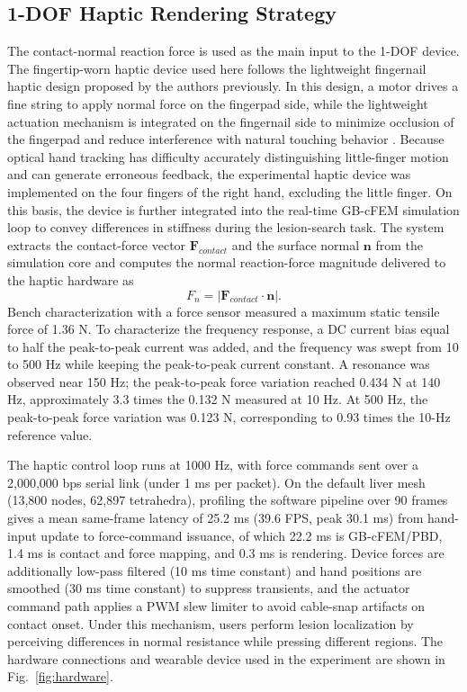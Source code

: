 \documentclass{ieeeaccess}
\begin{document}
\subsection{1-DOF Haptic Rendering Strategy}
The contact-normal reaction force is used as the main input to the 1-DOF device. The fingertip-worn haptic device used here follows the lightweight fingernail haptic design proposed by the authors previously. In this design, a motor drives a fine string to apply normal force on the fingerpad side, while the lightweight actuation mechanism is integrated on the fingernail side to minimize occlusion of the fingerpad and reduce interference with natural touching behavior \cite{xu2025lightweight}. Because optical hand tracking has difficulty accurately distinguishing little-finger motion and can generate erroneous feedback, the experimental haptic device was implemented on the four fingers of the right hand, excluding the little finger. On this basis, the device is further integrated into the real-time GB-cFEM simulation loop to convey differences in stiffness during the lesion-search task. The system extracts the contact-force vector $\mathbf{F}_{contact}$ and the surface normal $\mathbf{n}$ from the simulation core and computes the normal reaction-force magnitude delivered to the haptic hardware as
\begin{equation}
F_n = \left| \mathbf{F}_{contact} \cdot \mathbf{n} \right|.
\end{equation}
Bench characterization with a force sensor measured a maximum static tensile force of 1.36 N. To characterize the frequency response, a DC current bias equal to half the peak-to-peak current was added, and the frequency was swept from 10 to 500 Hz while keeping the peak-to-peak current constant. A resonance was observed near 150 Hz; the peak-to-peak force variation reached 0.434 N at 140 Hz, approximately 3.3 times the 0.132 N measured at 10 Hz. At 500 Hz, the peak-to-peak force variation was 0.123 N, corresponding to 0.93 times the 10-Hz reference value.

The haptic control loop runs at 1000 Hz, with force commands sent over a 2{,}000{,}000 bps serial link (under 1 ms per packet). On the default liver mesh (13{,}800 nodes, 62{,}897 tetrahedra), profiling the software pipeline over 90 frames gives a mean same-frame latency of 25.2 ms (39.6 FPS, peak 30.1 ms) from hand-input update to force-command issuance, of which 22.2 ms is GB-cFEM/PBD, 1.4 ms is contact and force mapping, and 0.3 ms is rendering. Device forces are additionally low-pass filtered (10 ms time constant) and hand positions are smoothed (30 ms time constant) to suppress transients, and the actuator command path applies a PWM slew limiter to avoid cable-snap artifacts on contact onset. Under this mechanism, users perform lesion localization by perceiving differences in normal resistance while pressing different regions. The hardware connections and wearable device used in the experiment are shown in Fig.~\ref{fig:hardware}.
\end{document}
